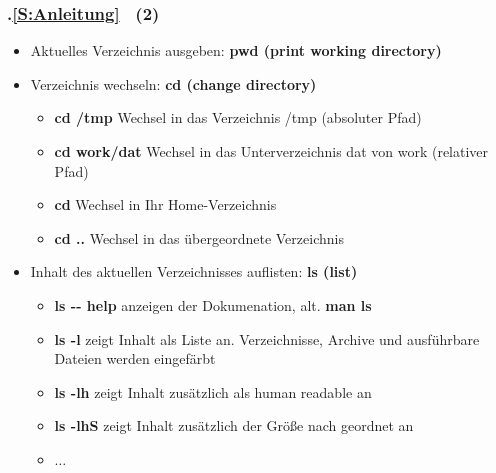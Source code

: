 \begin{frame}[t]%
\frametitle{\kap.\ref{S:Anleitung} \stitle\ (2)}%

\begin{itemize}
  \setlength{\itemsep}{4pt}
  \item Aktuelles Verzeichnis ausgeben: \textbf{pwd (print working directory)}
  \item Verzeichnis wechseln: \textbf{cd (change directory)}
  \begin{itemize}
    \setlength{\itemsep}{2pt}
    \item \textbf{cd /tmp} Wechsel in das Verzeichnis /tmp (absoluter Pfad)
    \item \textbf{cd work/dat} Wechsel in das Unterverzeichnis dat von work (relativer Pfad)
    \item \textbf{cd} Wechsel in Ihr Home-Verzeichnis
    \item \textbf{cd ..} Wechsel in das übergeordnete Verzeichnis
  \end{itemize}
  \item Inhalt des aktuellen Verzeichnisses auflisten: \textbf{ls (list)}
  \begin{itemize}
    \setlength{\itemsep}{2pt}
    \item \textbf{ls -{}- help} anzeigen der Dokumenation, alt. \textbf{man ls}
    \item \textbf{ls -l} zeigt Inhalt als Liste an. Verzeichnisse, Archive und ausführbare Dateien werden eingefärbt
    \item \textbf{ls -lh} zeigt Inhalt zusätzlich als human readable an
    \item \textbf{ls -lhS} zeigt Inhalt zusätzlich der Grö\ss e nach geordnet an
    \item $\ldots$
  \end{itemize}
\end{itemize}
\end{frame}


